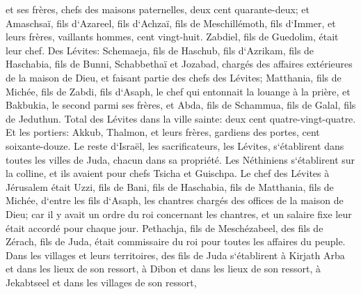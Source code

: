 \verse et ses frères, chefs des maisons paternelles, deux cent quarante-deux; et Amaschsaï, fils d`Azareel, fils d`Achzaï, fils de Meschillémoth, fils d`Immer, 
\verse et leurs frères, vaillants hommes, cent vingt-huit. Zabdiel, fils de Guedolim, était leur chef. 
\verse Des Lévites: Schemaeja, fils de Haschub, fils d`Azrikam, fils de Haschabia, fils de Bunni, 
\verse Schabbethaï et Jozabad, chargés des affaires extérieures de la maison de Dieu, et faisant partie des chefs des Lévites; 
\verse Matthania, fils de Michée, fils de Zabdi, fils d`Asaph, le chef qui entonnait la louange à la prière, et Bakbukia, le second parmi ses frères, et Abda, fils de Schammua, fils de Galal, fils de Jeduthun. 
\verse Total des Lévites dans la ville sainte: deux cent quatre-vingt-quatre. 
\verse Et les portiers: Akkub, Thalmon, et leurs frères, gardiens des portes, cent soixante-douze. 
\verse Le reste d`Israël, les sacrificateurs, les Lévites, s`établirent dans toutes les villes de Juda, chacun dans sa propriété. 
\verse Les Néthiniens s`établirent sur la colline, et ils avaient pour chefs Tsicha et Guischpa. 
\verse Le chef des Lévites à Jérusalem était Uzzi, fils de Bani, fils de Haschabia, fils de Matthania, fils de Michée, d`entre les fils d`Asaph, les chantres chargés des offices de la maison de Dieu; 
\verse car il y avait un ordre du roi concernant les chantres, et un salaire fixe leur était accordé pour chaque jour. 
\verse Pethachja, fils de Meschézabeel, des fils de Zérach, fils de Juda, était commissaire du roi pour toutes les affaires du peuple. 
\verse Dans les villages et leurs territoires, des fils de Juda s`établirent à Kirjath Arba et dans les lieux de son ressort, à Dibon et dans les lieux de son ressort, à Jekabtseel et dans les villages de son ressort, 
